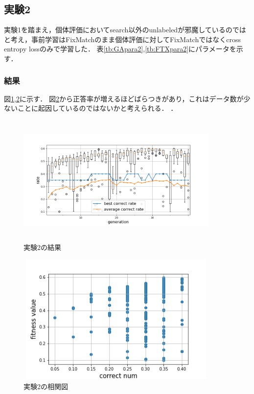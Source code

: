 \documentclass[twocolumn]{jarticle}     %
\begin{document}
\subsection{実験2}
実験1を踏まえ，個体評価においてsearch以外のunlabeledが邪魔しているのではと考え，事前学習はFixMatchのまま個体評価に対してFixMatchではなくcross　entropy lossのみで学習した．
表\ref{tb:GApara2},\ref{tb:FTXpara2}にパラメータを示す．

\subsubsection{結果}
図\ref{fig:ex2},\ref{fig:ex2_1}に示す．
図\ref{fig:ex2_1}から正答率が増えるほどばらつきがあり，これはデータ数が少ないことに起因しているのではないかと考えられる．
．
\begin{figure}[h]
	\begin{center}
		\vspace*{-3mm}
		\hspace*{-12mm}
		\includegraphics[height=65mm,width=100mm]{graph2.png}
		\caption{実験2の結果\label{fig:ex2}}
	\end{center}
\end{figure}
\begin{figure}[h]
	\begin{center}
		\vspace*{-3mm}
		\hspace*{-12mm}
		\includegraphics[height=65mm,width=100mm]{img2.png}
		\caption{実験2の相関図\label{fig:ex2_1}}
	\end{center}
\end{figure}
\end{document}
